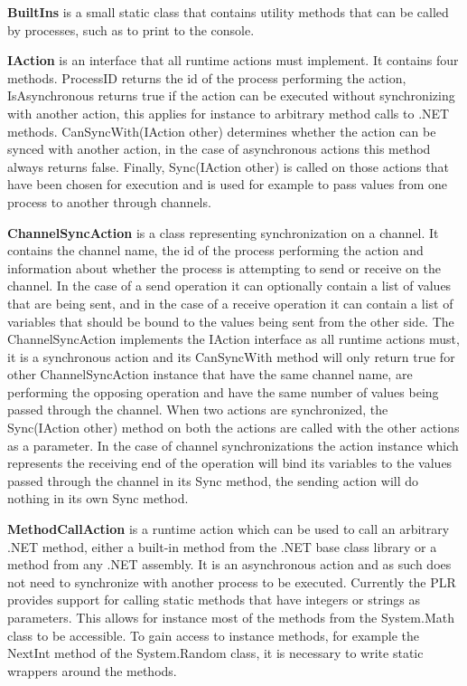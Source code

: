 	\textbf{BuiltIns} is a small static class that contains utility methods
	that can be called by processes, such as to print to the console.
	
	\textbf{IAction} is an interface that all runtime actions must implement.
	It contains four methods. \textsf{ProcessID} returns the id of the
	process performing the action, \textsf{IsAsynchronous} returns true if
	the action can be executed without synchronizing with another action, 
	this applies for instance to arbitrary method calls to .NET methods.
	\textsf{CanSyncWith(IAction other)} determines whether the action can be 
	synced with another action, in the case of asynchronous actions this
	method always returns false. Finally, \textsf{Sync(IAction other)} is 
	called on those actions that have been chosen for execution and is used
	for example to pass values from one process to another through channels.

	\textbf{ChannelSyncAction} is a class representing synchronization on a
	channel. It contains the channel name, the id of the process performing
	the action and information about whether the process is attempting to send
	or receive on the channel. In the case of a send operation it can optionally
	contain a list of values that are being sent, and in the case of a receive
	operation it can contain a list of variables that should be bound to the 
	values being sent from the other side. The \textsf{ChannelSyncAction}
	implements the \textsf{IAction} interface as all runtime actions must, it is
	a synchronous action and its \textsf{CanSyncWith} method will only return 
	true for other \textsf{ChannelSyncAction} instance that have the same
	channel name, are performing the opposing operation and have the same
	number of values being passed through the channel. When two actions are
	synchronized, the \textsf{Sync(IAction other)} method on both the actions
	are called with the other actions as a parameter. In the case of channel 
	synchronizations the action instance which represents the receiving end
	of the operation will bind its variables to the values passed through
	the channel in its \textsf{Sync} method, the sending action will do nothing
	in its own \textsf{Sync} method.
	
	\textbf{MethodCallAction} is a runtime action which can be used to call
	an arbitrary .NET method, either a built-in method from the .NET base
	class library or a method from any .NET assembly. It is an asynchronous 
	action and as such does not need to synchronize with another process to be 
	executed. Currently	the PLR provides support for calling static methods 
	that have integers or	strings as parameters. This allows for instance most
	of the methods from the \textsf{System.Math} class to be accessible. To
	gain access to instance methods, for example the \textsf{NextInt} method
	of the \textsf{System.Random} class, it is necessary to write static wrappers
	around the methods.

